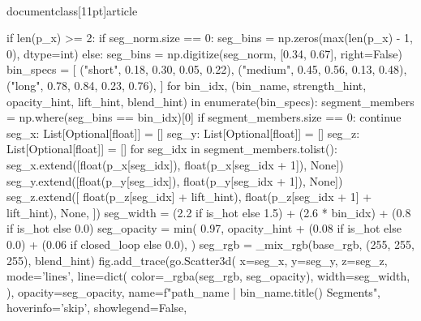 \\documentclass[11pt]{article}
\begin{document}
\begin{CodeBlock}
{{{{{{                    if len(p_x) >= 2:
                        if seg_norm.size == 0:
                            seg_bins = np.zeros(max(len(p_x) - 1, 0), dtype=int)
                        else:
                            seg_bins = np.digitize(seg_norm, [0.34, 0.67], right=False)
                        bin_specs = [
                            ("short", 0.18, 0.30, 0.05, 0.22),
                            ("medium", 0.45, 0.56, 0.13, 0.48),
                            ("long", 0.78, 0.84, 0.23, 0.76),
                        ]
                        for bin_idx, (bin_name, strength_hint, opacity_hint, lift_hint, blend_hint) in enumerate(bin_specs):
                            segment_members = np.where(seg_bins == bin_idx)[0]
                            if segment_members.size == 0:
                                continue
                            seg_x: List[Optional[float]] = []
                            seg_y: List[Optional[float]] = []
                            seg_z: List[Optional[float]] = []
                            for seg_idx in segment_members.tolist():
                                seg_x.extend([float(p_x[seg_idx]), float(p_x[seg_idx + 1]), None])
                                seg_y.extend([float(p_y[seg_idx]), float(p_y[seg_idx + 1]), None])
                                seg_z.extend([
                                    float(p_z[seg_idx] + lift_hint),
                                    float(p_z[seg_idx + 1] + lift_hint),
                                    None,
                                ])
                            seg_width = (2.2 if is_hot else 1.5) + (2.6 * bin_idx) + (0.8 if is_hot else 0.0)
                            seg_opacity = min(
                                0.97,
                                opacity_hint + (0.08 if is_hot else 0.0) + (0.06 if closed_loop else 0.0),
                            )
                            seg_rgb = _mix_rgb(base_rgb, (255, 255, 255), blend_hint)
                            fig.add_trace(go.Scatter3d(
                                x=seg_x,
                                y=seg_y,
                                z=seg_z,
                                mode='lines',
                                line=dict(
                                    color=_rgba(seg_rgb, seg_opacity),
                                    width=seg_width,
                                ),
                                opacity=seg_opacity,
                                name=f"{path_name} | {bin_name.title()} Segments",
                                hoverinfo='skip',
                                showlegend=False,
}}}}}}
\end{CodeBlock}
\end{document}
